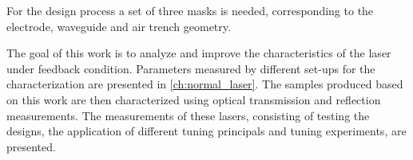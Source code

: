 For the design process a set of three masks is needed, corresponding to the electrode, waveguide and air trench geometry.

The goal of this work is to analyze and improve the characteristics of the laser under feedback condition. Parameters measured by different set-ups for the characterization are presented in \autoref{ch:normal_laser}. The samples produced based on this work are then characterized using optical transmission and reflection measurements. The measurements of these lasers, consisting of testing the designs, the application of different tuning principals and tuning experiments, are presented.